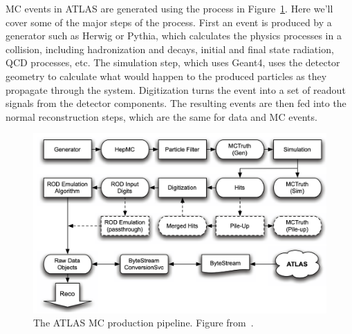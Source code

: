 MC events in ATLAS are generated using the process in Figure~\ref{fig:MC_process}. Here we'll cover some of the major steps of the process. First an event is produced by a generator such as Herwig or Pythia, which calculates the physics processes in a collision, including hadronization and decays, initial and final state radiation, QCD processes, etc. The simulation step, which uses Geant4, uses the detector geometry to calculate what would happen to the produced particles as they propagate through the system. Digitization turns the event into a set of readout signals from the detector components. The resulting events are then fed into the normal reconstruction steps, which are the same for data and MC events.

\begin{figure}[htbp]
    \centering
    \includegraphics[width=\linewidth]{Images/ATLAS/MC.png}
    \caption{The ATLAS MC production pipeline. Figure from~\cite{ATLAS_computing_TDR}.}
    \label{fig:MC_process}
\end{figure}